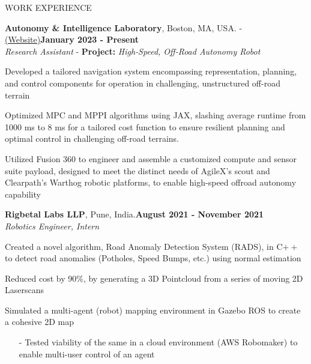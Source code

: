 \documentclass{resume} %
\begin{document}
\begin{rSection}{WORK EXPERIENCE}
\begin{rSubsectiond}{\textbf{Autonomy \& Intelligence Laboratory}, Boston, MA, USA. - \href{https://neu-autonomy.github.io/lab_website/team/}{(Website)}}{\textbf{January 2023 - Present} \\\textit{Research Assistant} - \textbf{Project:} \textit{High-Speed, Off-Road Autonomy Robot}}
        \item Developed a tailored navigation system encompassing representation, planning, and control components for operation in challenging, unstructured off-road terrain
        \item Optimized MPC and MPPI algorithms using JAX, slashing average runtime from 1000 ms to 8 ms for a tailored cost function to ensure resilient planning and optimal control in challenging off-road terrains.
        \item Utilized Fusion 360 to engineer and assemble a customized compute and sensor suite payload, designed to meet the distinct needs of AgileX's scout and Clearpath's Warthog robotic platforms, to enable high-speed offroad autonomy capability
	\end{rSubsectiond}

	\begin{rSubsectiond}{\textbf{Rigbetal Labs LLP}, Pune, India.}{\textbf{August 2021 - November 2021} \\\textit{Robotics Engineer, Intern}}
	\item Created a novel algorithm, Road Anomaly Detection System (RADS), in C$++$ to detect road anomalies (Potholes, Speed Bumps, etc.) using normal estimation
	\item Reduced cost by 90\%, by generating a 3D Pointcloud from a series of moving 2D Laserscans
	\item Simulated a multi-agent (robot) mapping environment in Gazebo ROS to create a cohesive 2D map
	\begin{itemize}
 \vspace{-2mm}
	    \item[-] Tested viability of the same in a cloud environment (AWS Robomaker) to enable multi-user control of an agent
	\end{itemize}
	\end{rSubsectiond}


\end{rSection}
\end{document}

